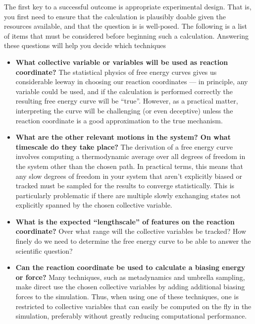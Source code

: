 
\label{s:precheck}


The first key to a successful outcome is appropriate experimental design.  That is, you first need to ensure that the calculation is plausibly doable given the resources available, and that the question is is well-posed.  The following is a list of items that must be considered before beginning such a calculation.  Answering these questions will help you decide which techniques

\begin{itemize}

    \item \textbf{What collective variable or variables will be used as reaction
    coordinate?}  The statistical physics of free energy curves gives us
    considerable leeway in choosing our reaction coordinates --- in principle,
    any variable could be used, and if the calculation is performed correctly
    the resulting free energy curve will be ``true''.  However, as a practical
    matter, interpreting the curve will be challenging (or even deceptive)
    unless the reaction coordinate is a good approximation to the true
    mechanism.

    \item \textbf{What are the other relevant motions in the system? On what
    timescale do they take place?}  The derivation of a free energy curve
    involves computing a thermodynamic average over all degrees of freedom in
    the system other than the chosen path.  In practical terms, this means that
    any slow degrees of freedom in your system that aren't explicitly biased or
    tracked must be sampled for the results to converge statistically.  This is
    particularly problematic if there are multiple slowly exchanging states not
    explicitly spanned by the chosen collective variable.

    \item \textbf{What is the expected ``lengthscale'' of features on the
    reaction coordinate?}  Over what range will the collective variables be
    tracked? How finely do we need to determine the free energy curve to be able
    to answer the scientific question?

    \item \textbf{Can the reaction coordinate be used to calculate a biasing
    energy or force? }  Many techniques, such as metadynamics and umbrella
    sampling, make direct use the chosen collective variables by adding
    additional biasing forces to the simulation.  Thus, when using one of these
    techniques, one is restricted to collective variables that can easily be
    computed on the fly in the simulation, preferably without greatly reducing
    computational performance.


\end{itemize}
